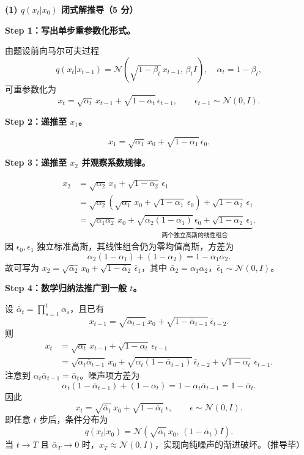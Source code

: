\documentclass[11pt,a4paper]{article}
\begin{document}
\noindent\textbf{(1) $q(x_t|x_0)$ 闭式解推导（5 分）}

\textbf{Step 1：写出单步重参数化形式。}

由题设前向马尔可夫过程
\[
q(x_t|x_{t-1})=\mathcal{N}\!\left(\sqrt{1-\beta_t}\,x_{t-1},\,\beta_t I\right),
\quad \alpha_t=1-\beta_t,
\]
可重参数化为
\[
x_t=\sqrt{\alpha_t}\,x_{t-1}+\sqrt{1-\alpha_t}\,\epsilon_{t-1},\qquad \epsilon_{t-1}\sim\mathcal{N}(0,I).
\]

\textbf{Step 2：递推至 $x_1$。}

\[
x_1=\sqrt{\alpha_1}\,x_0+\sqrt{1-\alpha_1}\,\epsilon_0.
\]

\textbf{Step 3：递推至 $x_2$ 并观察系数规律。}

\[
\begin{aligned}
x_2&=\sqrt{\alpha_2}\,x_1+\sqrt{1-\alpha_2}\,\epsilon_1\\
&=\sqrt{\alpha_2}\!\left(\sqrt{\alpha_1}\,x_0+\sqrt{1-\alpha_1}\,\epsilon_0\right)+\sqrt{1-\alpha_2}\,\epsilon_1\\
&=\sqrt{\alpha_1\alpha_2}\,x_0+\underbrace{\sqrt{\alpha_2(1-\alpha_1)}\,\epsilon_0+\sqrt{1-\alpha_2}\,\epsilon_1}_{\text{两个独立高斯的线性组合}}.
\end{aligned}
\]
因 $\epsilon_0,\epsilon_1$ 独立标准高斯，其线性组合仍为零均值高斯，方差为
\[
\alpha_2(1-\alpha_1)+(1-\alpha_2)=1-\alpha_1\alpha_2.
\]
故可写为 $x_2=\sqrt{\bar\alpha_2}\,x_0+\sqrt{1-\bar\alpha_2}\,\bar\epsilon_1$，其中 $\bar\alpha_2=\alpha_1\alpha_2$，$\bar\epsilon_1\sim\mathcal{N}(0,I)$。

\textbf{Step 4：数学归纳法推广到一般 $t$。}

设 $\bar\alpha_t=\prod_{s=1}^{t}\alpha_s$，且已有
\[
x_{t-1}=\sqrt{\bar\alpha_{t-1}}\,x_0+\sqrt{1-\bar\alpha_{t-1}}\,\bar\epsilon_{t-2}.
\]
则
\[
\begin{aligned}
x_t&=\sqrt{\alpha_t}\,x_{t-1}+\sqrt{1-\alpha_t}\,\epsilon_{t-1}\\
&=\sqrt{\alpha_t\bar\alpha_{t-1}}\,x_0+\sqrt{\alpha_t(1-\bar\alpha_{t-1})}\,\bar\epsilon_{t-2}+\sqrt{1-\alpha_t}\,\epsilon_{t-1}.
\end{aligned}
\]
注意到 $\alpha_t\bar\alpha_{t-1}=\bar\alpha_t$。噪声项方差为
\[
\alpha_t(1-\bar\alpha_{t-1})+(1-\alpha_t)=1-\alpha_t\bar\alpha_{t-1}=1-\bar\alpha_t.
\]
因此
\[
x_t=\sqrt{\bar\alpha_t}\,x_0+\sqrt{1-\bar\alpha_t}\,\epsilon,\qquad \epsilon\sim\mathcal{N}(0,I).
\]
即任意 $t$ 步后，条件分布为
\[
\boxed{q(x_t|x_0)=\mathcal{N}\!\left(\sqrt{\bar\alpha_t}\,x_0,\,(1-\bar\alpha_t)I\right).}
\]
当 $t\to T$ 且 $\bar\alpha_T\to 0$ 时，$x_T\approx\mathcal{N}(0,I)$，实现向纯噪声的渐进破坏。（推导毕）
\end{document}

